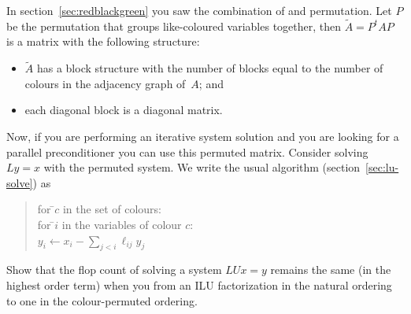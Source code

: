 In section~\ref{sec:redblackgreen} you saw the combination of
 and permutation. Let $P$ be the
permutation that groups like-coloured variables together, then $\tilde
A=P^tAP$ is a matrix with the following structure:
\begin{itemize}
\item $\tilde A$ has a block structure with the number of blocks equal
  to the number of colours in the adjacency graph of~$A$; and
\item each diagonal block is a diagonal matrix.
\end{itemize}
Now, if you are performing an iterative system solution
and you are looking for a parallel preconditioner you can use this
permuted matrix. Consider solving $Ly=x$ with the permuted system. We
write the usual algorithm (section~\ref{sec:lu-solve}) as
\begin{quotation}
  \begin{tabbing}
    for \=$c$ in the set of colours:\\
    \>for \=$i$ in the variables of colour $c$:\\
    \>\>$y_i\leftarrow x_i-\sum_{j<i} \ell_{ij}y_j$
  \end{tabbing}
\end{quotation}

\begin{exercise}
  Show that the flop count of solving a system $LUx=y$ remains the
  same (in the highest order term) when you from an \ac{ILU}
  factorization in the natural ordering to one in the colour-permuted
  ordering.
\end{exercise}


